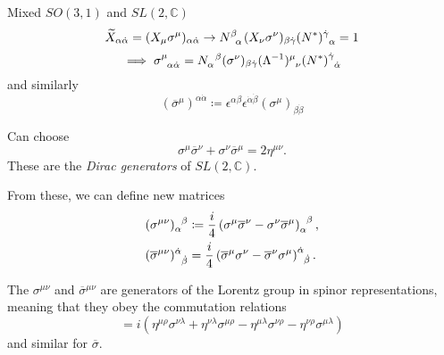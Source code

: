 
Mixed $SO(3, 1)$ and $SL(2, \mathbb{C})$
\begin{equation}
  \widetilde{X}_{\alpha \dot{\alpha}} = (X_{\mu} \sigma^{\mu})_{\alpha \dot{\alpha}} \to N\indices{^{\beta}_{\alpha}} (X_{\nu} \sigma^{\nu})_{\beta \dot{\gamma}} (N^*)\indices{^{\dot{\gamma}}_{\alpha}} = 1
\end{equation}
\begin{equation}
  \implies \sigma\indices{^{\mu}_{\alpha \dot{\alpha}}} = N\indices{_{\alpha}^{\beta}} (\sigma^{\nu})_{\beta \dot{\gamma}} (\Lambda^{-1})\indices{^{\mu}_{\nu}} (N^*) \indices{^{\dot{\gamma}}_{\dot{\alpha}}}
\end{equation}
and similarly
\begin{equation}
  (\overline{\sigma}^{\mu})^{\alpha \dot{\alpha}} \coloneqq \epsilon^{\alpha\beta} \epsilon^{\dot{\alpha} \dot{\beta}} (\sigma^{\mu})_{\beta \dot{\beta}}
\end{equation}

Can choose
\begin{equation}
  \sigma^{\mu} \overline{\sigma}{}^{\nu} + \sigma^{\nu} \overline{\sigma}{}^{\mu} = 2 \eta^{\mu\nu}.
\end{equation}
These are the \emph{Dirac generators} of $SL(2, \mathbb{C})$.
\begin{definition}[]
  From these, we can define new matrices
  \begin{align}
    (\sigma^{\mu\nu})\indices{_{\alpha}^{\beta}} &\coloneqq \frac{i}{4} \left( \sigma^{\mu} \overline{\sigma}{}^{\nu} - \sigma^{\nu} \overline{\sigma}{}^{\mu} \right)\indices{_{\alpha}^{\beta}}, \\
    (\overline{\sigma}{}^{\mu\nu})\indices{^{\dot{\alpha}}_{\dot{\beta}}}&= \frac{i}{4} \left( \overline{\sigma}{}^{\mu} \sigma^{\nu} - \overline{\sigma}{}^{\nu} \sigma^{\mu} \right) \indices{^{\dot{\alpha}}_{\dot{\beta}}}.
  \end{align}
\end{definition}
\begin{claim}
  The $\sigma^{\mu\nu}$ and $\overline{\sigma}{}^{\mu\nu}$ are generators of the Lorentz group in spinor representations, meaning that they obey the commutation relations
  \begin{equation}
    [\sigma^{\mu\nu}, \sigma^{\lambda\rho}] = i \left( \eta^{\mu\rho} \sigma^{\nu\lambda} + \eta^{\nu\lambda} \sigma^{\mu\rho} - \eta^{\mu\lambda} \sigma^{\nu\rho} - \eta^{\nu\rho} \sigma^{\mu\lambda} \right)
  \end{equation}
  and similar for $\overline{\sigma}{}$.
\end{claim}

